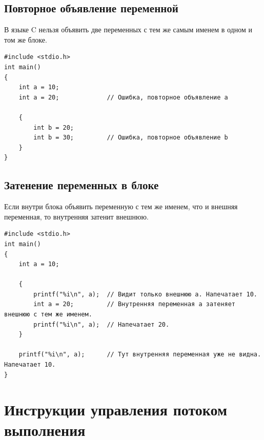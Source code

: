 \documentclass[10pt]{article}
\begin{document}
\subsection*{Повторное объявление переменной}
В языке C нельзя объявить две переменных с тем же самым именем в одном и том же блоке. 
\begin{lstlisting}
#include <stdio.h>
int main() 
{
    int a = 10;
    int a = 20;				// Ошибка, повторное объявление a
    
    {
        int b = 20;			
        int b = 30;			// Ошибка, повторное объявление b
    }
}
\end{lstlisting}


\subsection*{Затенение переменных в блоке}
Если внутри блока объявить переменную с тем же именем, что и внешняя переменная, то внутренняя затенит внешнюю.
\begin{lstlisting}
#include <stdio.h>
int main() 
{
    int a = 10;
    
    {
        printf("%i\n", a);  // Видит только внешнюю a. Напечатает 10.
        int a = 20;			// Внутренняя переменная a затеняет внешнюю с тем же именем.
        printf("%i\n", a);  // Напечатает 20.
    }
    
    printf("%i\n", a);  	// Тут внутренняя переменная уже не видна. Напечатает 10.
}
\end{lstlisting}



\newpage
\section*{Инструкции управления потоком выполнения}
\end{document}
